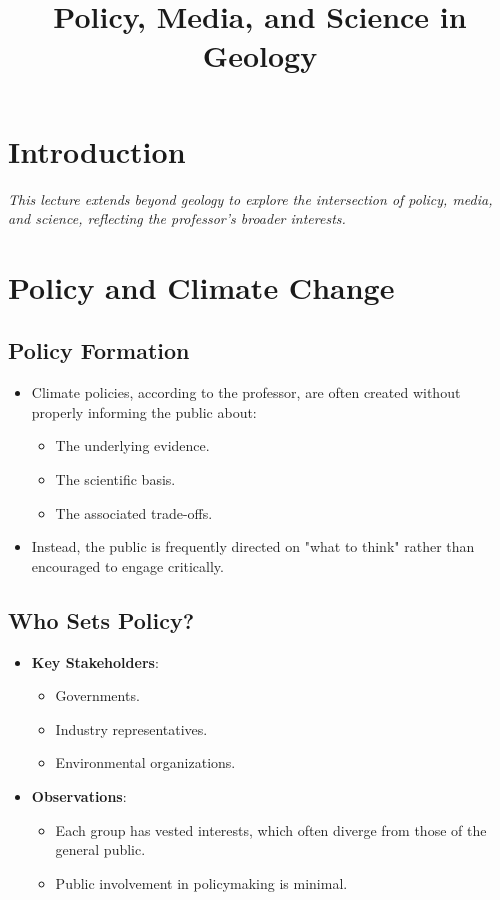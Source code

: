 \documentclass[12pt]{article}
\title{Policy, Media, and Science in Geology}
\author{}
\date{}
\begin{document}
\maketitle

\section*{Introduction}
\textit{This lecture extends beyond geology to explore the intersection of policy, media, and science, reflecting the professor's broader interests.}

\section*{Policy and Climate Change}
\subsection*{Policy Formation}
\begin{itemize}
    \item Climate policies, according to the professor, are often created without properly informing the public about:
    \begin{itemize}
        \item The underlying evidence.
        \item The scientific basis.
        \item The associated trade-offs.
    \end{itemize}
    \item Instead, the public is frequently directed on "what to think" rather than encouraged to engage critically.
\end{itemize}

\subsection*{Who Sets Policy?}
\begin{itemize}
    \item \textbf{Key Stakeholders}:
    \begin{itemize}
        \item Governments.
        \item Industry representatives.
        \item Environmental organizations.
    \end{itemize}
    \item \textbf{Observations}:
    \begin{itemize}
        \item Each group has vested interests, which often diverge from those of the general public.
        \item Public involvement in policymaking is minimal.
    \end{itemize}
\end{itemize}
\end{document}
